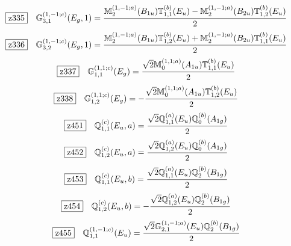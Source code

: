 \documentclass[fleqn,10pt,landscape]{jsarticle}
\begin{document}
\begin{dmath*}
\hspace*{3mm}\fbox{z335}\quad \mathbb{G}_{3,1}^{(1,-1;c)}(E_{g},1)=\frac{\mathbb{M}_{2}^{(1,-1;a)}(B_{1u}) \mathbb{T}_{1,1}^{(b)}(E_{u}) - \mathbb{M}_{2}^{(1,-1;a)}(B_{2u}) \mathbb{T}_{1,2}^{(b)}(E_{u})}{2}
\end{dmath*}
\begin{dmath*}
\hspace*{3mm}\fbox{z336}\quad \mathbb{G}_{3,2}^{(1,-1;c)}(E_{g},1)=\frac{\mathbb{M}_{2}^{(1,-1;a)}(B_{1u}) \mathbb{T}_{1,2}^{(b)}(E_{u}) + \mathbb{M}_{2}^{(1,-1;a)}(B_{2u}) \mathbb{T}_{1,1}^{(b)}(E_{u})}{2}
\end{dmath*}
\begin{dmath*}
\hspace*{3mm}\fbox{z337}\quad \mathbb{G}_{1,1}^{(1,1;c)}(E_{g})=\frac{\sqrt{2} \mathbb{M}_{0}^{(1,1;a)}(A_{1u}) \mathbb{T}_{1,1}^{(b)}(E_{u})}{2}
\end{dmath*}
\begin{dmath*}
\hspace*{3mm}\fbox{z338}\quad \mathbb{G}_{1,2}^{(1,1;c)}(E_{g})=- \frac{\sqrt{2} \mathbb{M}_{0}^{(1,1;a)}(A_{1u}) \mathbb{T}_{1,2}^{(b)}(E_{u})}{2}
\end{dmath*}
\begin{dmath*}
\hspace*{3mm}\fbox{z451}\quad \mathbb{Q}_{1,1}^{(c)}(E_{u},a)=\frac{\sqrt{2} \mathbb{Q}_{1,1}^{(a)}(E_{u}) \mathbb{Q}_{0}^{(b)}(A_{1g})}{2}
\end{dmath*}
\begin{dmath*}
\hspace*{3mm}\fbox{z452}\quad \mathbb{Q}_{1,2}^{(c)}(E_{u},a)=\frac{\sqrt{2} \mathbb{Q}_{1,2}^{(a)}(E_{u}) \mathbb{Q}_{0}^{(b)}(A_{1g})}{2}
\end{dmath*}
\begin{dmath*}
\hspace*{3mm}\fbox{z453}\quad \mathbb{Q}_{1,1}^{(c)}(E_{u},b)=\frac{\sqrt{2} \mathbb{Q}_{1,1}^{(a)}(E_{u}) \mathbb{Q}_{2}^{(b)}(B_{1g})}{2}
\end{dmath*}
\begin{dmath*}
\hspace*{3mm}\fbox{z454}\quad \mathbb{Q}_{1,2}^{(c)}(E_{u},b)=- \frac{\sqrt{2} \mathbb{Q}_{1,2}^{(a)}(E_{u}) \mathbb{Q}_{2}^{(b)}(B_{1g})}{2}
\end{dmath*}
\begin{dmath*}
\hspace*{3mm}\fbox{z455}\quad \mathbb{Q}_{1,1}^{(1,-1;c)}(E_{u})=\frac{\sqrt{2} \mathbb{G}_{2,1}^{(1,-1;a)}(E_{u}) \mathbb{Q}_{2}^{(b)}(B_{1g})}{2}
\end{dmath*}
\end{document}
